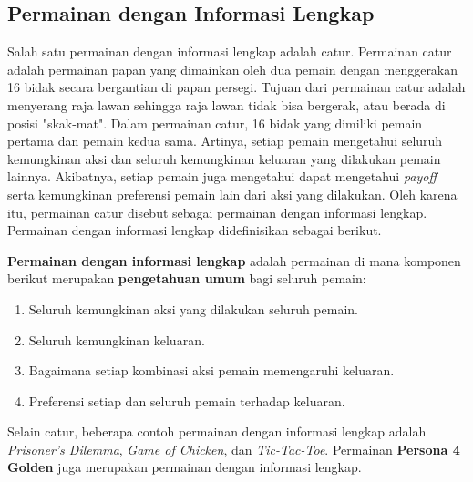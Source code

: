 \subsection{Permainan dengan Informasi Lengkap}
Salah satu permainan dengan informasi lengkap adalah catur. Permainan catur adalah permainan papan yang dimainkan oleh dua pemain dengan menggerakan 16 bidak secara bergantian di papan persegi. Tujuan dari permainan catur adalah menyerang raja lawan sehingga raja lawan tidak bisa bergerak, atau berada di posisi "skak-mat". Dalam permainan catur, 16 bidak yang dimiliki pemain pertama dan pemain kedua sama. Artinya, setiap pemain mengetahui seluruh kemungkinan aksi dan seluruh kemungkinan keluaran yang dilakukan pemain lainnya. Akibatnya, setiap pemain juga mengetahui dapat mengetahui \textit{payoff} serta kemungkinan preferensi pemain lain dari aksi yang dilakukan. Oleh karena itu, permainan catur disebut sebagai permainan dengan informasi lengkap. Permainan dengan informasi lengkap didefinisikan sebagai berikut.
\begin{definisi}
    \textbf{Permainan dengan informasi lengkap} adalah permainan di mana komponen berikut merupakan \textbf{pengetahuan umum} bagi seluruh pemain:
    \begin{enumerate}
        \item Seluruh kemungkinan aksi yang dilakukan seluruh pemain.
        \item Seluruh kemungkinan keluaran.
        \item Bagaimana setiap kombinasi aksi pemain memengaruhi keluaran.
        \item Preferensi setiap dan seluruh pemain terhadap keluaran.
    \end{enumerate}
\end{definisi}

Selain catur, beberapa contoh permainan dengan informasi lengkap adalah \textit{Prisoner's Dilemma}, \textit{Game of Chicken}, dan \textit{Tic-Tac-Toe}. Permainan \textbf{Persona 4 Golden} juga merupakan permainan dengan informasi lengkap.

